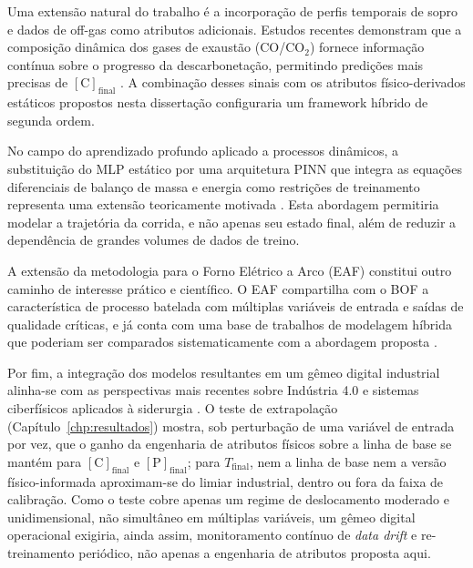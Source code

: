 Uma extensão natural do trabalho é a incorporação de perfis temporais de sopro e dados de off-gas como atributos adicionais. Estudos recentes demonstram que a composição dinâmica dos gases de exaustão (CO/CO$_2$) fornece informação contínua sobre o progresso da descarbonetação, permitindo predições mais precisas de $[\text{C}]_{\text{final}}$ \cite{zhou2024bof,shao2024hybrid}. A combinação desses sinais com os atributos físico-derivados estáticos propostos nesta dissertação configuraria um framework híbrido de segunda ordem.

No campo do aprendizado profundo aplicado a processos dinâmicos, a substituição do MLP estático por uma arquitetura PINN que integra as equações diferenciais de balanço de massa e energia como restrições de treinamento representa uma extensão teoricamente motivada \cite{raissi2019pinns,xia2024dmpinn}. Esta abordagem permitiria modelar a trajetória da corrida, e não apenas seu estado final, além de reduzir a dependência de grandes volumes de dados de treino.

A extensão da metodologia para o Forno Elétrico a Arco (EAF) constitui outro caminho de interesse prático e científico. O EAF compartilha com o BOF a característica de processo batelada com múltiplas variáveis de entrada e saídas de qualidade críticas, e já conta com uma base de trabalhos de modelagem híbrida que poderiam ser comparados sistematicamente com a abordagem proposta \cite{skrjanc2022eaf,logar2022eaf,manojlovic2022eaf}.

Por fim, a integração dos modelos resultantes em um gêmeo digital industrial alinha-se com as perspectivas mais recentes sobre Indústria 4.0 e sistemas ciberfísicos aplicados à siderurgia \cite{fuller2020digital,lee2015cps,hermann2016industrie4}. O teste de extrapolação (Capítulo~\ref{chp:resultados}) mostra, sob perturbação de uma variável de entrada por vez, que o ganho da engenharia de atributos físicos sobre a linha de base se mantém para $[\text{C}]_\text{final}$ e $[\text{P}]_\text{final}$; para $T_\text{final}$, nem a linha de base nem a versão físico-informada aproximam-se do limiar industrial, dentro ou fora da faixa de calibração. Como o teste cobre apenas um regime de deslocamento moderado e unidimensional, não simultâneo em múltiplas variáveis, um gêmeo digital operacional exigiria, ainda assim, monitoramento contínuo de \textit{data drift} e re-treinamento periódico, não apenas a engenharia de atributos proposta aqui.